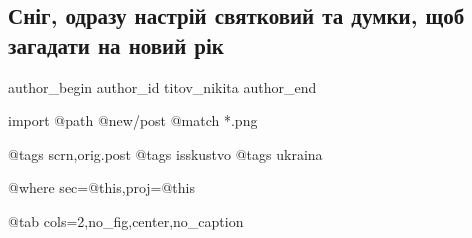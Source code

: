  
 
 
 
 
 
\subsection{Сніг, одразу настрій святковий та думки, щоб загадати на новий рік}
\label{sec:18_11_2022.fb.titov_nikita.2.sneg_prazdnik}
 
\ifcmt
 author_begin
   author_id titov_nikita
 author_end
\fi

\ifcmt
  import
    @path @new/post
    @match *.png

    @tags scrn,orig.post
    @tags isskustvo
    @tags ukraina

    @where sec=@this,proj=@this
  
    @tab cols=2,no_fig,center,no_caption
\fi
